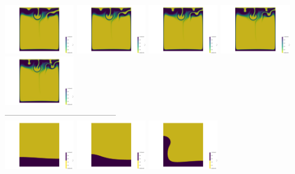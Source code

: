\begin{itemize}
\begin{center}
\includegraphics[width=3cm]{images/benchmark_vaks97/aspect/lvl7/composition0015}
\includegraphics[width=3cm]{images/benchmark_vaks97/aspect/lvl7/composition0016}
\includegraphics[width=3cm]{images/benchmark_vaks97/aspect/lvl7/composition0017}
\includegraphics[width=3cm]{images/benchmark_vaks97/aspect/lvl7/composition0018}
\includegraphics[width=3cm]{images/benchmark_vaks97/aspect/lvl7/composition0019}\\
---------------------------------------\\
\includegraphics[width=3cm]{images/benchmark_vaks97/aspect/lvl7/composition_threshold0000}
\includegraphics[width=3cm]{images/benchmark_vaks97/aspect/lvl7/composition_threshold0001}
\includegraphics[width=3cm]{images/benchmark_vaks97/aspect/lvl7/composition_threshold0002}

\end{center}
\end{itemize}
